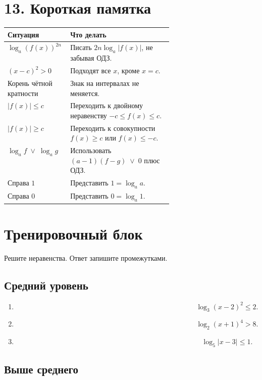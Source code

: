 \documentclass[a4paper,12pt]{article}
\begin{document}
\section*{13. Короткая памятка}

\begin{center}
\renewcommand{\arraystretch}{1.35}
\begin{tabularx}{\linewidth}{@{}p{0.38\linewidth}X@{}}
\toprule
\textbf{Ситуация} & \textbf{Что делать} \\
\midrule
\(\log_a(f(x))^{2n}\) & Писать \(2n\log_a|f(x)|\), не забывая ОДЗ. \\
\((x-c)^2>0\) & Подходят все \(x\), кроме \(x=c\). \\
Корень чётной кратности & Знак на интервалах не меняется. \\
\(|f(x)|\le c\) & Переходить к двойному неравенству \(-c\le f(x)\le c\). \\
\(|f(x)|\ge c\) & Переходить к совокупности \(f(x)\ge c\) или \(f(x)\le -c\). \\
\(\log_a f\;\vee\;\log_a g\) & Использовать \((a-1)(f-g)\;\vee\;0\) плюс ОДЗ. \\
Справа \(1\) & Представить \(1=\log_a a\). \\
Справа \(0\) & Представить \(0=\log_a1\). \\
\bottomrule
\end{tabularx}
\end{center}

\newpage

\section*{Тренировочный блок}

Решите неравенства. Ответ запишите промежутками.

\subsection*{Средний уровень}

\begin{enumerate}
  \item
  \[
  \log_3(x-2)^2\le2.
  \]

  \item
  \[
  \log_2(x+1)^4>8.
  \]

  \item
  \[
  \log_5|x-3|\le1.
  \]
\end{enumerate}

\subsection*{Выше среднего}
\end{document}
